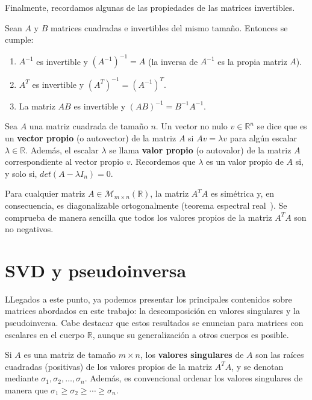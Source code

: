Finalmente, recordamos algunas de las propiedades de las matrices invertibles.

\begin{proposicion}
    Sean $A$ y $B$ matrices cuadradas e invertibles del mismo tamaño. Entonces se cumple:

    \begin{enumerate}
        \item $A^{-1}$ es invertible y ${(A^{-1})}^{-1} = A$ (la inversa de $A^{-1}$ es la propia matriz $A$).
        \item $A^{T}$ es invertible y ${(A^{T})}^{-1} = {(A^{-1})}^{T}$.
        \item La matriz $AB$ es invertible y ${(AB)}^{-1} = B^{-1}A^{-1}$.
    \end{enumerate}
\end{proposicion}

\begin{definicion}
    Sea $A$ una matriz cuadrada de tamaño $n$. Un vector no nulo $v \in \mathbb{R}^{n}$ se dice que es un \textbf{vector propio} (o autovector) de la matriz $A$ si $Av=\lambda v$ para algún escalar $\lambda \in \mathbb{R}$. Además, el escalar $\lambda$ se llama \textbf{valor propio} (o autovalor) de la matriz $A$ correspondiente al vector propio $v$. Recordemos que $\lambda$ es un valor propio de $A$ si, y solo si, $det(A-\lambda I_n)=0$.
\end{definicion}

Para cualquier matriz $A \in \mathcal{M}_{m \times n}(\mathbb{R})$, la matriz $A^{T}A$ es simétrica y, en consecuencia, es diagonalizable ortogonalmente (teorema espectral real~\cite{Blum2021}). Se comprueba de manera sencilla que todos los valores propios de la matriz $A^{T}A$ son no negativos.

\section{SVD y pseudoinversa}\label{sec:svd-pseudoinversa}

LLegados a este punto, ya podemos presentar los principales contenidos sobre matrices abordados en este trabajo: la descomposición en valores singulares y la pseudoinversa. Cabe destacar que estos resultados se enuncian para matrices con escalares en el cuerpo $\mathbb{R}$, aunque su generalización a otros cuerpos es posible.

\begin{definicion}
    Si $A$ es una matriz de tamaño $m \times n$, los \textbf{valores singulares} de $A$ son las raíces cuadradas (positivas) de los valores propios de la matriz $A^{T}A$, y se denotan mediante $\sigma_{1}, \sigma_{2}, \ldots, \sigma_{n}$. Además, es convencional ordenar los valores singulares de manera que $\sigma_{1} \geq \sigma_{2} \geq \cdots \geq \sigma_{n}$.
\end{definicion}


